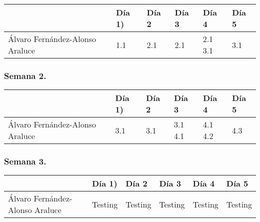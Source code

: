 \begin{table}[h]
	\centering
	\begin{tabular}{| p{2cm} | p{2cm} | p{2cm} | p{2cm} | p{2cm} | p{2cm} |}
		\rowcolor[HTML]{329A9D} 
		 & {\color[HTML]{FFFFFF} \textbf{Día 1)}} & {\color[HTML]{FFFFFF} \textbf{Día 2}} & {\color[HTML]{FFFFFF} \textbf{Día 3}} & {\color[HTML]{FFFFFF} \textbf{Día 4}}  & {\color[HTML]{FFFFFF} \textbf{Día 5}} \\ \hline
		Álvaro Fernández-Alonso Araluce & 1.1 & 2.1 & 2.1 & 2.1 3.1 & 3.1 \\ \hline
	\end{tabular}
\end{table}

\subsubsection{Semana 2.}

\begin{table}[h]
	\centering
	\begin{tabular}{| p{2cm} | p{2cm} | p{2cm} | p{2cm} | p{2cm} | p{2cm} |}
		\rowcolor[HTML]{329A9D} 
		& {\color[HTML]{FFFFFF} \textbf{Día 1)}} & {\color[HTML]{FFFFFF} \textbf{Día 2}} & {\color[HTML]{FFFFFF} \textbf{Día 3}} & {\color[HTML]{FFFFFF} \textbf{Día 4}}  & {\color[HTML]{FFFFFF} \textbf{Día 5}} \\ \hline
		Álvaro Fernández-Alonso Araluce & 3.1 & 3.1 & 3.1 4.1 & 4.1 4.2 & 4.3 \\ \hline
	\end{tabular}
\end{table}

\subsubsection{Semana 3.}

\begin{table}[h]
	\centering
	\begin{tabular}{| p{2cm} | p{2cm} | p{2cm} | p{2cm} | p{2cm} | p{2cm} |}
		\rowcolor[HTML]{329A9D} 
		& {\color[HTML]{FFFFFF} \textbf{Día 1)}} & {\color[HTML]{FFFFFF} \textbf{Día 2}} & {\color[HTML]{FFFFFF} \textbf{Día 3}} & {\color[HTML]{FFFFFF} \textbf{Día 4}}  & {\color[HTML]{FFFFFF} \textbf{Día 5}} \\ \hline
		Álvaro Fernández-Alonso Araluce & Testing & Testing & Testing & Testing & Testing \\ \hline
	\end{tabular}
\end{table}

